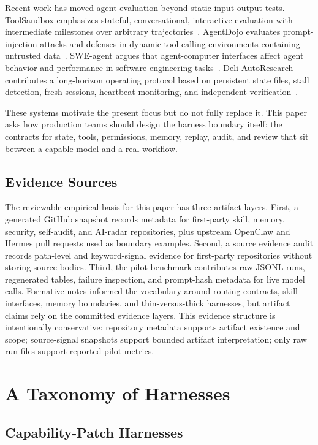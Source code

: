 \documentclass[11pt]{article}
\begin{document}
Recent work has moved agent evaluation beyond static input-output tests. ToolSandbox emphasizes stateful, conversational, interactive evaluation with intermediate milestones over arbitrary trajectories~\cite{toolsandbox}. AgentDojo evaluates prompt-injection attacks and defenses in dynamic tool-calling environments containing untrusted data~\cite{agentdojo}. SWE-agent argues that agent-computer interfaces affect agent behavior and performance in software engineering tasks~\cite{sweagent,aci}. Deli AutoResearch contributes a long-horizon operating protocol based on persistent state files, stall detection, fresh sessions, heartbeat monitoring, and independent verification~\cite{deli}.

These systems motivate the present focus but do not fully replace it. This paper asks how production teams should design the harness boundary itself: the contracts for state, tools, permissions, memory, replay, audit, and review that sit between a capable model and a real workflow.

\subsection{Evidence Sources}

The reviewable empirical basis for this paper has three artifact layers. First, a generated GitHub snapshot records metadata for first-party skill, memory, security, self-audit, and AI-radar repositories, plus upstream OpenClaw and Hermes pull requests used as boundary examples. Second, a source evidence audit records path-level and keyword-signal evidence for first-party repositories without storing source bodies. Third, the pilot benchmark contributes raw JSONL runs, regenerated tables, failure inspection, and prompt-hash metadata for live model calls. Formative notes informed the vocabulary around routing contracts, skill interfaces, memory boundaries, and thin-versus-thick harnesses, but artifact claims rely on the committed evidence layers. This evidence structure is intentionally conservative: repository metadata supports artifact existence and scope; source-signal snapshots support bounded artifact interpretation; only raw run files support reported pilot metrics.

\section{A Taxonomy of Harnesses}

\subsection{Capability-Patch Harnesses}
\end{document}
